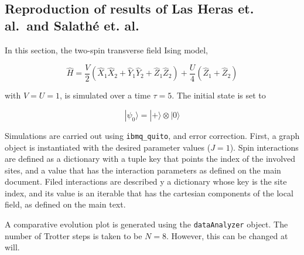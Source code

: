     \begin{center}
    \end{center}
    { \hspace*{\fill} \\}
    
    \hypertarget{reproduction-of-results-of-las-heras-et.-al.-and-salathuxe9-et.-al.}{%
\subsection{Reproduction of results of Las Heras et. al.~and Salathé et.
al.}\label{reproduction-of-results-of-las-heras-et.-al.-and-salathuxe9-et.-al.}}

In this section, the two-spin transverse field Ising model,

\[
\hat{H} = \frac{V}{2}(\hat{X}_1\hat{X}_2 + \hat{Y}_1\hat{Y}_2 + \hat{Z}_1\hat{Z}_2) + \frac{U}{4}(\hat{Z}_1 + \hat{Z}_2)
\]

with \(V = U = 1\), is simulated over a time \(\tau = 5\). The initial
state is set to

\[
|\psi_0\rangle = |+\rangle\otimes|0\rangle
\]

Simulations are carried out using \texttt{ibmq\_quito}, and error
correction. First, a graph object is instantiated with the desired
parameter values (\(J=1\)). Spin interactions are defined as a
dictionary with a tuple key that points the index of the involved sites,
and a value that has the interaction parameters as defined on the main
document. Filed interactions are described y a dictionary whose key is
the site index, and its value is an iterable that has the cartesian
components of the local field, as defined on the main text.

    A comparative evolution plot is generated using the
\texttt{dataAnalyzer} object. The number of Trotter steps is taken to be
\(N = 8\). However, this can be changed at will.

